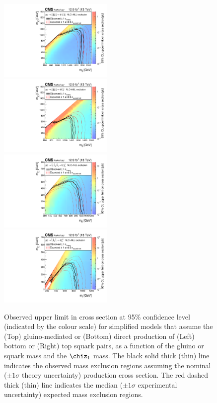 \begin{figure}[thp!]
  \begin{center}
    \includegraphics[width=0.49\textwidth]{SUS16T1bbbbXSEC.pdf} ~
    \includegraphics[width=0.49\textwidth]{SUS16T1ttttXSEC.pdf} \\
    \includegraphics[width=0.49\textwidth]{SUS16T2bbXSEC.pdf} ~
    \includegraphics[width=0.49\textwidth]{SUS16T2ttXSEC.pdf} 
    \caption{Observed upper limit in cross section at 95\% confidence
      level (indicated by the colour scale) for simplified models that
      assume the (Top) gluino-mediated or (Bottom) direct production
      of (Left) bottom or (Right) top squark pairs, as a function of
      the gluino or squark mass and the $\chiz_{1}$ 
      mass. The black solid thick (thin) line indicates the observed
      mass exclusion regions assuming the nominal (${\pm}1 \sigma$
      theory uncertainty) production cross section. The red dashed
      thick (thin) line indicates the median (${\pm}1 \sigma$
      experimental uncertainty) expected mass exclusion
      regions. 
      \label{fig:limits-sms} }
  \end{center}
\end{figure}
  
